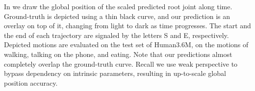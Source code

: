 In  we draw the global position of the scaled predicted root joint along time.
Ground-truth is depicted using a thin black curve, and our prediction is an overlay on top of it, changing from light to dark as time progresses. The start and the end of each trajectory are signaled by the letters S and E, respectively.
Depicted motions are evaluated on the test set of Human3.6M, on the motions of walking, talking on the phone, and eating.
Note that our predictions almost completely overlap the ground-truth curve. 
Recall we use weak perspective to bypass dependency on intrinsic parameters, resulting in up-to-scale global position accuracy. 





